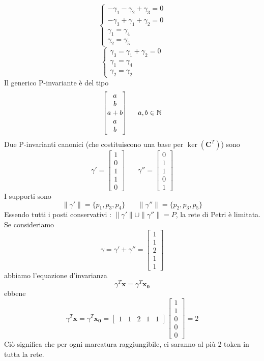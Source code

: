 \documentclass[10pt, letterpaper]{report}
\begin{document}
$$\begin{cases}
    -\gamma_1-\gamma_2+\gamma_3=0\\ 
    -\gamma_3+\gamma_1+\gamma_2=0\\ 
    \gamma_1=\gamma_4\\ 
    \gamma_2=\gamma_5
\end{cases} $$
$$\begin{cases}
    \gamma_3=\gamma_1+\gamma_2=0\\ 
    \gamma_1=\gamma_4\\ 
    \gamma_2=\gamma_2
\end{cases} $$
Il generico P-invariante è del tipo 
$$\begin{bmatrix}
    a \\ 
    b \\ 
    a+b \\ 
    a \\ 
    b
\end{bmatrix} \ \ \ \ a,b\in{\mathbb N}$$
Due P-invarianti canonici (che costituiscono una base per $\ker(\mathbf C^T)$) sono 
$$\gamma'=\begin{bmatrix}
    1 \\ 
    0 \\ 
    1 \\ 
    1 \\ 
    0
\end{bmatrix} 
\ \ \ \ \ \ \ \
\gamma''=\begin{bmatrix}
    0 \\ 
    1 \\ 
    1 \\ 
   0 \\ 
    1
\end{bmatrix}$$
I supporti sono 
$$\|\gamma'\|=\{p_1,p_3,p_4\} \ \ \ \ \ \ \ \ \|\gamma''\|=\{p_2,p_3,p_5\}$$
Essendo tutti i posti conservativi : $\|\gamma'\|\cup \|\gamma''\|=P$, la rete di Petri è limitata. Se consideriamo 
$$\gamma=\gamma'+\gamma''= \begin{bmatrix}
    1 \\ 
    1 \\ 
    2 \\ 
   1 \\ 
    1
\end{bmatrix}$$
abbiamo l'equazione d'invarianza 
$$ \gamma^T\mathbf x = \gamma^T\mathbf{x_0}$$
ebbene 
$$ \gamma^T\mathbf x =
\gamma^T\mathbf{x_0}=\begin{bmatrix}
    1 &
    1 &
    2 & 
   1& 
    1
\end{bmatrix}\begin{bmatrix}
    1\\ 1\\ 0\\ 0 \\ 0
\end{bmatrix} =2
$$
Ciò significa che per ogni marcatura raggiungibile, ci saranno al più 2 token in tutta la rete.
\end{document}
